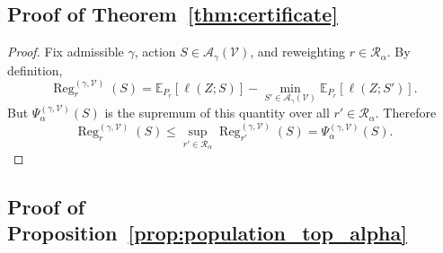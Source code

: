 \documentclass{article}
\newcommand{\EE}{\mathbb{E}}
\newcommand{\cA}{\mathcal{A}}
\newcommand{\cR}{\mathcal{R}}
\newcommand{\cV}{\mathcal{V}}
\newcommand{\loss}{\ell}
\newcommand{\1}{\mathbbm{1}}
\begin{document}
\subsection{Proof of Theorem~\ref{thm:certificate}}

\begin{proof}
Fix admissible \(\gamma\), action \(S\in\cA_\gamma(\cV)\), and reweighting \(r\in\cR_\alpha\). By definition,
\[
    \operatorname{Reg}^{(\gamma,\cV)}_r(S)
    =
    \EE_{P_r}[\loss(Z;S)]
    -
    \min_{S'\in\cA_\gamma(\cV)}
    \EE_{P_r}[\loss(Z;S')].
\]
But \(\Psi^{(\gamma,\cV)}_\alpha(S)\) is the supremum of this quantity over all \(r'\in\cR_\alpha\). Therefore
\[
    \operatorname{Reg}^{(\gamma,\cV)}_r(S)
    \le
    \sup_{r'\in\cR_\alpha}
    \operatorname{Reg}^{(\gamma,\cV)}_{r'}(S)
    =
    \Psi^{(\gamma,\cV)}_\alpha(S).
\]
\end{proof}

\subsection{Proof of Proposition~\ref{prop:population_top_alpha}}
\end{document}
